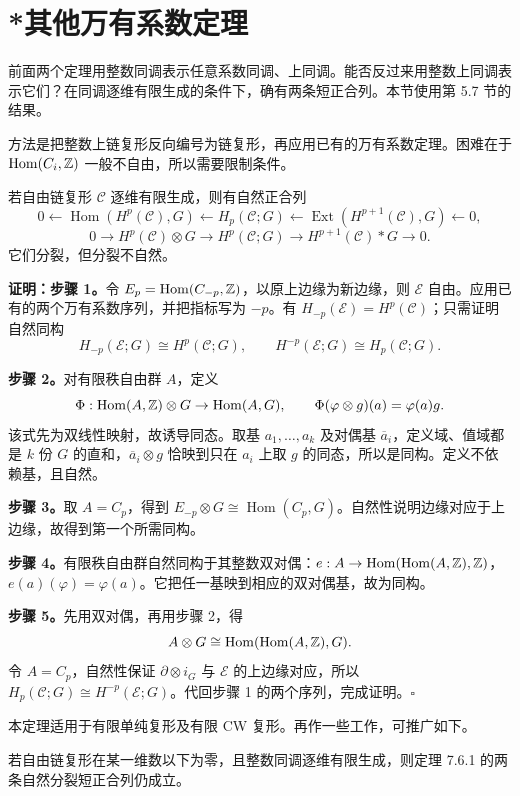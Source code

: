 \section{*其他万有系数定理}
前面两个定理用整数同调表示任意系数同调、上同调。能否反过来用整数上同调表示它们？在同调逐维有限生成的条件下，确有两条短正合列。本节使用第 5.7 节的结果。

方法是把整数上链复形反向编号为链复形，再应用已有的万有系数定理。困难在于 $\operatorname{Hom}(C_i,\mathbb{Z})$ 一般不自由，所以需要限制条件。

若自由链复形 $\mathcal C$ 逐维有限生成，则有自然正合列
\[
0\leftarrow\operatorname{Hom}(H^p(\mathcal C),G)\leftarrow H_p(\mathcal C;G)
\leftarrow\operatorname{Ext}(H^{p+1}(\mathcal C),G)\leftarrow0,
\]
\[
0\to H^p(\mathcal C)\otimes G\to H^p(\mathcal C;G)\to H^{p+1}(\mathcal C)*G\to0.
\]
它们分裂，但分裂不自然。

\textbf{证明：步骤 1。}令 $E_p=\operatorname{Hom}(C_{-p},\mathbb{Z})$，以原上边缘为新边缘，则 $\mathcal E$ 自由。应用已有的两个万有系数序列，并把指标写为 $-p$。有 $H_{-p}(\mathcal E)=H^p(\mathcal C)$；只需证明自然同构
\[
H_{-p}(\mathcal E;G)\cong H^p(\mathcal C;G),\qquad
H^{-p}(\mathcal E;G)\cong H_p(\mathcal C;G).
\]

\textbf{步骤 2。}对有限秩自由群 $A$，定义
\[
\Phi:\operatorname{Hom}(A,\mathbb{Z})\otimes G\to\operatorname{Hom}(A,G),\qquad
\Phi(\varphi\otimes g)(a)=\varphi(a)g.
\]
该式先为双线性映射，故诱导同态。取基 $a_1,\ldots,a_k$ 及对偶基 $\overline a_i$，定义域、值域都是 $k$ 份 $G$ 的直和，$\overline a_i\otimes g$ 恰映到只在 $a_i$ 上取 $g$ 的同态，所以是同构。定义不依赖基，且自然。

\textbf{步骤 3。}取 $A=C_p$，得到 $E_{-p}\otimes G\cong\operatorname{Hom}(C_p,G)$。自然性说明边缘对应于上边缘，故得到第一个所需同构。

\textbf{步骤 4。}有限秩自由群自然同构于其整数双对偶：$e:A\to\operatorname{Hom}(\operatorname{Hom}(A,\mathbb{Z}),\mathbb{Z})$，$e(a)(\varphi)=\varphi(a)$。它把任一基映到相应的双对偶基，故为同构。

\textbf{步骤 5。}先用双对偶，再用步骤 2，得
\[
A\otimes G\cong\operatorname{Hom}(\operatorname{Hom}(A,\mathbb{Z}),G).
\]
令 $A=C_p$，自然性保证 $\partial\otimes i_G$ 与 $\mathcal E$ 的上边缘对应，所以 $H_p(\mathcal C;G)\cong H^{-p}(\mathcal E;G)$。代回步骤 1 的两个序列，完成证明。\hfill$\square$

本定理适用于有限单纯复形及有限 CW 复形。再作一些工作，可推广如下。

若自由链复形在某一维数以下为零，且整数同调逐维有限生成，则定理 7.6.1 的两条自然分裂短正合列仍成立。

